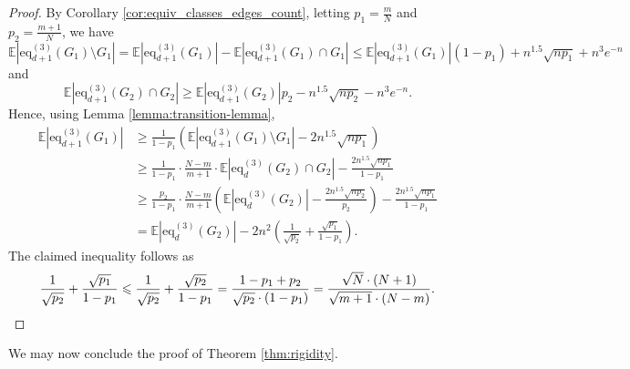 \documentclass[11pt,a4paper,oneside,reqno]{amsart}
\newcommand{\Ex}{\mathbb{E}}
\newcommand{\1}{\mathbbm{1}} %
\renewcommand{\le}{\leqslant}
\renewcommand{\ge}{\geqslant}
\newcommand{\eq}{\mathrm{eq}}
\begin{document}
\begin{proof}
    By Corollary \ref{cor:equiv_classes_edges_count}, letting $p_1 = \frac{m}{N}$ and $p_2 = \frac{m+1}{N}$, we have
    \[
        \Ex\left| \eq_{d+1}^{(3)}(G_1) \setminus G_1\right| = \Ex\left| \eq_{d+1}^{(3)}(G_1)\right| - \Ex\left| \eq_{d+1}^{(3)}(G_1) \cap G_1\right| \le \Ex\left| \eq_{d+1}^{(3)}(G_1)\right|(1-p_1) + n^{1.5} \sqrt{n p_1} + n^3 e^{-n}
    \]
    and
    \[
        \Ex\left|\eq_{d+1}^{(3)}(G_2) \cap G_2\right| \ge \Ex\left|\eq_{d+1}^{(3)}(G_2)\right| p_2 - n^{1.5} \sqrt{n p_2} - n^3 e^{-n}.
    \]
    Hence, using Lemma \ref{lemma:transition-lemma},
    \begin{align*}
        \Ex\left|\eq_{d+1}^{(3)}(G_1)\right| &\ge \frac{1}{1-p_1} \left(\Ex\left|\eq_{d+1}^{(3)}(G_1) \setminus G_1\right| - 2 n^{1.5} \sqrt{n p_1}\right) \\
        &\ge \frac{1}{1-p_1} \cdot \frac{N-m}{m+1} \cdot \Ex\left|\eq_{d}^{(3)}(G_2) \cap G_2\right| - \frac{2 n^{1.5} \sqrt{n p_1}}{1-p_1} \\
        &\ge \frac{p_2}{1-p_1} \cdot \frac{N-m}{m+1} \left(\Ex\left|\eq_{d}^{(3)}(G_2)\right| - \frac{2n^{1.5} \sqrt{n p_2}}{p_2}\right) - \frac{2 n^{1.5} \sqrt{n p_1}}{1-p_1} \\
        &= \Ex\left|\eq_{d}^{(3)}(G_2)\right| -2n^2 \left(\frac{1}{\sqrt{p_2}} + \frac{\sqrt{p_1}}{1-p_1}\right).
    \end{align*}
    The claimed inequality follows as
  \[
    \frac{1}{\sqrt{p_2}} + \frac{\sqrt{p_1}}{1-p_1} \le \frac{1}{\sqrt{p_2}} + \frac{\sqrt{p_2}}{1-p_1} = \frac{1-p_1+p_2}{\sqrt{p_2} \cdot (1-p_1)} = \frac{\sqrt{N} \cdot (N+1)}{\sqrt{m+1} \cdot (N-m)}.\qedhere
  \]
\end{proof}
We may now conclude the proof of Theorem \ref{thm:rigidity}.
\end{document}
